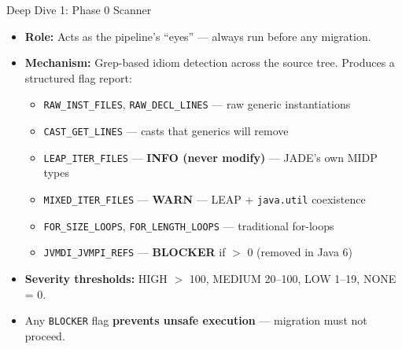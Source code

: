 \documentclass[aspectratio=169]{beamer}
\begin{document}
\begin{frame}{Deep Dive 1: Phase 0 Scanner}
\begin{itemize}
  \item \textbf{Role:} Acts as the pipeline's ``eyes'' --- always run before any migration.
  \item \textbf{Mechanism:} Grep-based idiom detection across the source tree. Produces a structured flag report:
  \begin{itemize}
    \item \texttt{RAW\_INST\_FILES}, \texttt{RAW\_DECL\_LINES} --- raw generic instantiations
    \item \texttt{CAST\_GET\_LINES} --- casts that generics will remove
    \item \texttt{LEAP\_ITER\_FILES} --- \textbf{INFO (never modify)} --- JADE's own MIDP types
    \item \texttt{MIXED\_ITER\_FILES} --- \textbf{WARN} --- LEAP + \texttt{java.util} coexistence
    \item \texttt{FOR\_SIZE\_LOOPS}, \texttt{FOR\_LENGTH\_LOOPS} --- traditional for-loops
    \item \texttt{JVMDI\_JVMPI\_REFS} --- \textbf{BLOCKER} if $>$ 0 (removed in Java 6)
  \end{itemize}
  \item \textbf{Severity thresholds:} HIGH $>$ 100, MEDIUM 20--100, LOW 1--19, NONE = 0.
  \item Any \texttt{BLOCKER} flag \textbf{prevents unsafe execution} --- migration must not proceed.
\end{itemize}
\end{frame}
\end{document}
